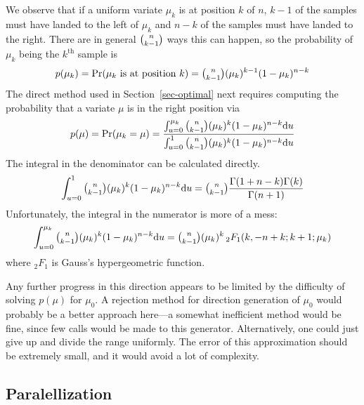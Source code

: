 \documentclass[12pt]{article}
\newcommand{\hyperg}{{{{}_2}{F_1}}}
\newcommand{\du}{{\text{d}u}}
\begin{document}
  We observe that if a uniform variate $\mu_k$ is at
  position $k$ of $n$, $k - 1$ of the samples must have landed to the
  left of $\mu_k$ and $n - k$ of the samples must have
  landed to the right.  There are in general $\tbinom{n}{k-1}$
  ways this can happen, so the probability of $\mu_k$ being
  the $k^{\text{th}}$ sample is $$
    p(\mu_k) = \text{Pr}(\mu_k\text{ is at position }k) =
         \tbinom{n}{k - 1}(\mu_k)^{k-1}(1-\mu_k)^{n - k}
  $$
  The direct method used in Section~\ref{sec-optimal}
  next requires computing the probability that a variate
  $\mu$ is in the right position via $$
    p(\mu) = \text{Pr}(\mu_k = \mu) =
      \frac{\int_{u=0}^{\mu_k}{\tbinom{n}{k - 1}(\mu_k)^k(1-\mu_k)^{n - k}}\du}
           {\int_{u=0}^{1}{\tbinom{n}{k - 1}(\mu_k)^k(1-\mu_k)^{n - k}}\du}
  $$
  The integral in the denominator can be calculated
  directly. $$
    \int_{u=0}^{1}{\tbinom{n}{k - 1}(\mu_k)^k(1-\mu_k)^{n - k}}\du = 
        \tbinom{n}{k - 1}\frac{\Gamma(1 + n - k)\Gamma(k)}{\Gamma(n + 1)}
  $$
  Unfortunately, the integral in the numerator is more of a
  mess: $$
    \int_{u=0}^{\mu_k}{\tbinom{n}{k - 1}(\mu_k)^k(1-\mu_k)^{n - k}}\du =
        \tbinom{n}{k - 1}(\mu_k)^k\,\hyperg(k, -n + k; k + 1; \mu_k)
  $$
  where $\hyperg$ is Gauss's hypergeometric function.

  Any further progress in this direction appears to be
  limited by the difficulty of solving $p(\mu)$
  for $\mu_0$.  A rejection method for direction generation
  of $\mu_0$ would probably be a better approach here---a
  somewhat inefficient method would be fine, since few calls
  would be made to this generator.  Alternatively, one could
  just give up and divide the range uniformly.  The error of
  this approximation should be extremely small, and it would
  avoid a lot of complexity.
  
\subsection{Paralellization}\label{sec-parallel}
\end{document}
